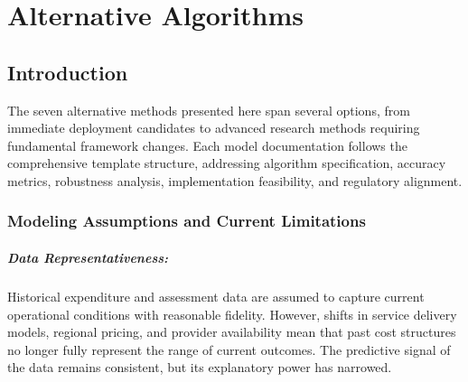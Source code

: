 \chapter{Alternative Algorithms}  \newpage

\section{Introduction}


The seven alternative methods presented here span several options, from immediate deployment candidates to advanced research methods requiring fundamental framework changes. Each model documentation follows the comprehensive template structure, addressing algorithm specification, accuracy metrics, robustness analysis, implementation feasibility, and regulatory alignment.

\subsection{Modeling Assumptions and Current Limitations}
 
 
\paragraph{Data Representativeness:} Historical expenditure and assessment data are assumed to capture current operational conditions with reasonable fidelity.  However, shifts in service delivery models, regional pricing, and provider availability mean that past cost structures no longer fully represent the range of current outcomes.  The predictive signal of the data remains consistent, but its explanatory power has narrowed.
 
